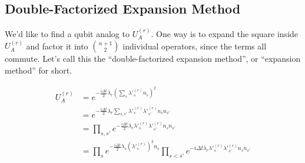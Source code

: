 \subsection{Double-Factorized Expansion Method}

We'd like to find a qubit analog to $U_A^{(r)}$. One way is to expand the square inside $U_A^{(r)}$ and factor it into ${n + 1 \choose 2}$ individual operators, since the terms all commute. Let's call this the ``double-factorized expansion method'', or ``expansion method'' for short.

\begin{equation}
    \begin{split}
        U_A^{(r)} &= e^{-\frac{i\Delta t}{2}\lambda_r\left(\sum_s \lambda'^{(r)}_s n_s\right)^2} \\
        &= e^{-\frac{i\Delta t}{2}\lambda_r\sum_{s, s'} \lambda'^{(r)}_s\lambda'^{(r)}_{s'} n_sn_{s'}} \\
        &= \prod_{s, s'} e^{-\frac{i\Delta t}{2}\lambda_r\lambda'^{(r)}_s\lambda'^{(r)}_{s'} n_sn_{s'}} \\
        &= \prod_s e^{-\frac{i\Delta t}{2}\lambda_s(\lambda'^{(r)}_s)^2 n_s}\prod_{s < s'} e^{-i\Delta t\lambda_r\lambda'^{(r)}_s\lambda'^{(r)}_{s'} n_sn_{s'}}
        \label{eq: expansion}
    \end{split}
\end{equation}

